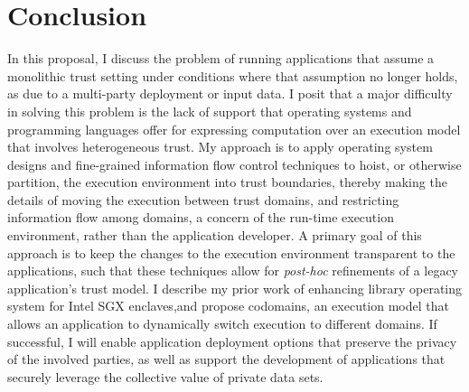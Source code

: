 \section{Conclusion}
\label{sec:conclusion}

In this proposal, I discuss the problem of running applications that
assume a monolithic trust setting under conditions where that assumption no
longer holds, as due to a multi-party deployment or input data.
%
I posit that a major difficulty in solving this problem is the lack of support
that operating systems and programming languages offer for expressing
computation over an execution model that involves heterogeneous trust.
%
My approach is to apply operating system designs and fine-grained information
flow control techniques to hoist, or otherwise partition, the execution
environment into trust boundaries, thereby making the details of moving the
execution between trust domains, and restricting information flow among domains, a
concern of the run-time execution environment, rather than the application
developer.
% 
A primary goal of this approach is to keep the changes to the execution environment
transparent to the applications, such that these techniques allow for
\emph{post-hoc} refinements of a legacy application's trust model.
% 
I describe my prior work of enhancing library operating system for Intel SGX
enclaves,and propose codomains, an execution model that allows an application to
dynamically switch execution to different domains.
%
If successful, I will enable application deployment options that preserve
the privacy of the involved parties, as well as support the development of
applications that securely leverage the collective value of private data sets.
